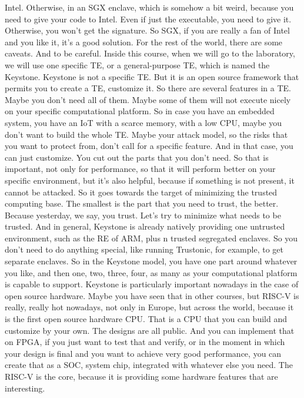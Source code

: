  Intel. Otherwise, in an SGX enclave, which is somehow a bit weird, because you
 need to give your code to Intel. Even if just the executable, you need to give
 it. Otherwise, you won't get the signature. So SGX, if you are really a fan of
 Intel and you like it, it's a good solution. For the rest of the world, there
 are some caveats. And to be careful. Inside this course, when we will go to
 the laboratory, we will use one specific TE, or a general-purpose TE, which is
 named the Keystone. Keystone is not a specific TE. But it is an open source
 framework that permits you to create a TE, customize it. So there are several
 features in a TE. Maybe you don't need all of them. Maybe some of them will
 not execute nicely on your specific computational platform. So in case you
 have an embedded system, you have an IoT with a scarce memory, with a low CPU,
 maybe you don't want to build the whole TE. Maybe your attack model, so the
 risks that you want to protect from, don't call for a specific feature. And in
 that case, you can just customize. You cut out the parts that you don't need.
 So that is important, not only for performance, so that it will perform better
 on your specific environment, but it's also helpful, because if something is
 not present, it cannot be attacked. So it goes towards the target of
 minimizing the trusted computing base. The smallest is the part that you need
 to trust, the better. Because yesterday, we say, you trust. Let's try to
 minimize what needs to be trusted. And in general, Keystone is already
 natively providing one untrusted environment, such as the RE of ARM, plus n
 trusted segregated enclaves. So you don't need to do anything special, like
 running Trustonic, for example, to get separate enclaves. So in the Keystone
 model, you have one part around whatever you like, and then one, two, three,
 four, as many as your computational platform is capable to support. Keystone
 is particularly important nowadays in the case of open source hardware. Maybe
 you have seen that in other courses, but RISC-V is really, really hot
 nowadays, not only in Europe, but across the world, because it is the first
 open source hardware CPU. That is a CPU that you can build and customize by
 your own. The designs are all public. And you can implement that on FPGA, if
 you just want to test that and verify, or in the moment in which your design
 is final and you want to achieve very good performance, you can create that as
 a SOC, system chip, integrated with whatever else you need. The RISC-V is the
 core, because it is providing some hardware features that are interesting.
